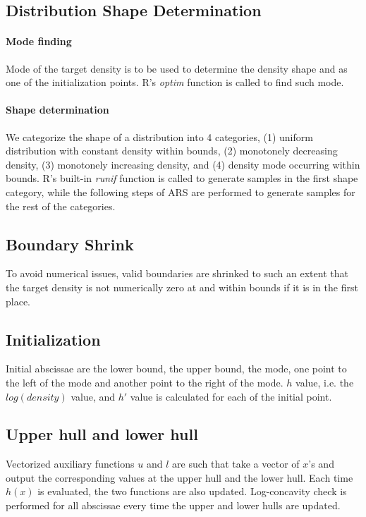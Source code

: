 \documentclass{article}\usepackage[]{graphicx}\usepackage[]{color}
\begin{document}
\subsection{Distribution Shape Determination}
\paragraph{Mode finding}
Mode of the target density is to be used to determine the density shape and as
one of the initialization points. R's \textit{optim} function is called
to find such mode.
\paragraph{Shape determination}
We categorize the shape of a distribution into 4 categories, (1) uniform distribution
with constant density within bounds, (2) monotonely decreasing density, (3) monotonely
increasing density, and (4) density mode occurring within bounds. R's built-in
\textit{runif} function is called to generate samples in the first shape category, while
the following steps of ARS are performed to generate samples for the rest of
the categories.

\subsection{Boundary Shrink}
To avoid numerical issues, valid boundaries are shrinked to such an extent that 
the target density is not numerically zero at and within bounds if it is in the 
first place.

\subsection{Initialization}
Initial abscissae are the lower bound, the upper bound, the mode, one point to
the left of the mode and another point to the right of the mode. $h$ value, i.e.
the $log(density)$ value, and $h'$ value is calculated for each of the initial
point.

\subsection{Upper hull and lower hull}
Vectorized auxiliary functions $u$ and $l$ are such that take a vector of $x$'s 
and output the corresponding values at the upper hull and the lower hull. Each time
$h(x)$ is evaluated, the two functions are also updated. Log-concavity check is
performed for all abscissae every time the upper and lower hulls are updated.
\end{document}
